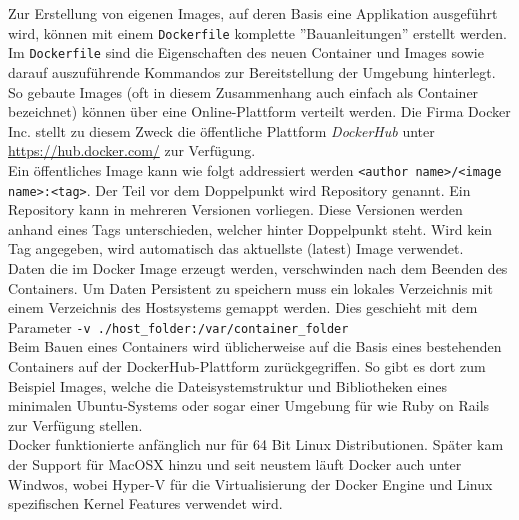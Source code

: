 Zur Erstellung von eigenen Images, auf deren Basis eine Applikation ausgeführt wird, können mit einem \lstinline[]|Dockerfile| komplette ''Bauanleitungen'' erstellt werden. Im \lstinline[]|Dockerfile| sind die Eigenschaften des neuen Container und Images sowie darauf auszuführende Kommandos zur Bereitstellung der Umgebung hinterlegt. \\

So gebaute Images (oft in diesem Zusammenhang auch einfach als Container bezeichnet) können über eine Online-Plattform verteilt werden. Die Firma Docker Inc. stellt zu diesem Zweck die öffentliche Plattform \emph{DockerHub} unter \url{https://hub.docker.com/} zur Verfügung. \\

Ein öffentliches Image kann wie folgt addressiert werden \lstinline[]|<author name>/<image name>:<tag>|. Der Teil vor dem Doppelpunkt wird Repository genannt. Ein Repository kann in mehreren Versionen vorliegen. Diese Versionen werden anhand eines Tags unterschieden, welcher hinter Doppelpunkt steht. Wird kein Tag angegeben, wird automatisch das aktuellste (latest) Image verwendet. \\

Daten die im Docker Image erzeugt werden, verschwinden nach dem Beenden des Containers. Um Daten Persistent zu speichern muss ein lokales Verzeichnis mit einem Verzeichnis des Hostsystems gemappt werden. Dies geschieht mit dem Parameter \lstinline[]|-v ./host_folder:/var/container_folder| \\

Beim Bauen eines Containers wird üblicherweise auf die Basis eines bestehenden Containers auf der DockerHub-Plattform zurückgegriffen. So gibt es dort zum Beispiel Images, welche die Dateisystemstruktur und Bibliotheken eines minimalen Ubuntu-Systems oder sogar einer Umgebung für  wie Ruby on Rails zur Verfügung stellen. \\

Docker funktionierte anfänglich nur für 64 Bit Linux Distributionen. Später kam der Support für MacOSX hinzu und seit neustem läuft Docker auch unter Windwos, wobei Hyper-V für die Virtualisierung der Docker Engine und Linux spezifischen Kernel Features verwendet wird.



